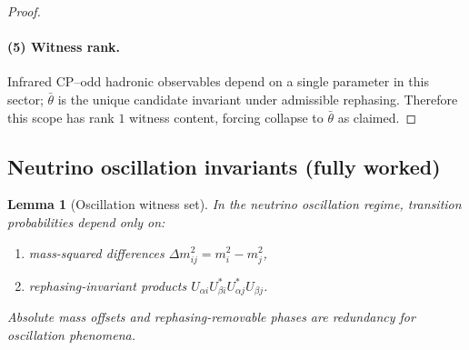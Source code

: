 \documentclass[11pt]{article}
\newtheorem{lemma}[definition]{Lemma}
\theoremstyle{remark}
\begin{document}
\begin{proof}
\paragraph{(5) Witness rank.}
Infrared CP--odd hadronic observables depend on a single parameter in this sector; $\bar\theta$ is the
unique candidate invariant under admissible rephasing.
Therefore this scope has rank $1$ witness content, forcing collapse to $\bar\theta$ as claimed.
\end{proof}

\subsection{Neutrino oscillation invariants (fully worked)}

\begin{lemma}[Oscillation witness set]\label{lem:osc}
In the neutrino oscillation regime, transition probabilities depend only on:
\begin{enumerate}[label=(\roman*),leftmargin=2.2em]
\item mass-squared differences $\Delta m^2_{ij}=m_i^2-m_j^2$,
\item rephasing-invariant products $U_{\alpha i}U_{\beta i}^\ast U_{\alpha j}^\ast U_{\beta j}$.
\end{enumerate}
Absolute mass offsets and rephasing-removable phases are redundancy for oscillation phenomena.
\end{lemma}
\end{document}
